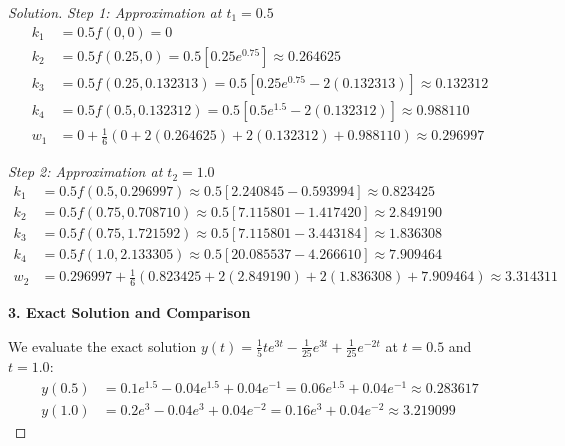 \documentclass[11pt, a4paper]{article}
\newif\ifsolutionnewpage
\newenvironment{solution}
  {\begin{proof}[Solution]}
  {\end{proof}\ifsolutionnewpage\newpage\fi}
\begin{document}
\begin{solution}
        \textit{Step 1: Approximation at $t_1 = 0.5$}
        \begin{align*}
        k_1 &= 0.5 f(0, 0) = 0 \\
        k_2 &= 0.5 f(0.25, 0) = 0.5 \left[0.25e^{0.75}\right] \approx 0.264625 \\
        k_3 &= 0.5 f(0.25, 0.132313) = 0.5 \left[0.25e^{0.75} - 2(0.132313)\right] \approx 0.132312 \\
        k_4 &= 0.5 f(0.5, 0.132312) = 0.5 \left[0.5e^{1.5} - 2(0.132312)\right] \approx 0.988110 \\
        w_1 &= 0 + \frac{1}{6}(0 + 2(0.264625) + 2(0.132312) + 0.988110) \approx \mathbf{0.296997}
        \end{align*}
        
        \textit{Step 2: Approximation at $t_2 = 1.0$}
        \begin{align*}
        k_1 &= 0.5 f(0.5, 0.296997) \approx 0.5 [2.240845 - 0.593994] \approx 0.823425 \\
        k_2 &= 0.5 f(0.75, 0.708710) \approx 0.5 [7.115801 - 1.417420] \approx 2.849190 \\
        k_3 &= 0.5 f(0.75, 1.721592) \approx 0.5 [7.115801 - 3.443184] \approx 1.836308 \\
        k_4 &= 0.5 f(1.0, 2.133305) \approx 0.5 [20.085537 - 4.266610] \approx 7.909464 \\
        w_2 &= 0.296997 + \frac{1}{6}(0.823425 + 2(2.849190) + 2(1.836308) + 7.909464) \approx \mathbf{3.314311}
        \end{align*}
        
        \vspace{0.3cm}
        \textbf{3. Exact Solution and Comparison}
        
        We evaluate the exact solution $y(t) = \frac{1}{5}te^{3t} - \frac{1}{25}e^{3t} + \frac{1}{25}e^{-2t}$ at $t=0.5$ and $t=1.0$:
        \begin{align*}
        y(0.5) &= 0.1e^{1.5} - 0.04e^{1.5} + 0.04e^{-1} = 0.06e^{1.5} + 0.04e^{-1} \approx \mathbf{0.283617} \\
        y(1.0) &= 0.2e^{3} - 0.04e^{3} + 0.04e^{-2} = 0.16e^{3} + 0.04e^{-2} \approx \mathbf{3.219099}
        \end{align*}
        

\end{solution}
\end{document}
